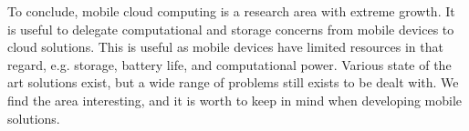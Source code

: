 To conclude, mobile cloud computing is a research area with extreme growth.
It is useful to delegate computational and storage concerns from mobile devices to cloud solutions.
This is useful as mobile devices have limited resources in that regard, e.g. storage, battery life, and computational power.
Various state of the art solutions exist, but a wide range of problems still exists to be dealt with.
We find the area interesting, and it is worth to keep in mind when developing mobile solutions.
